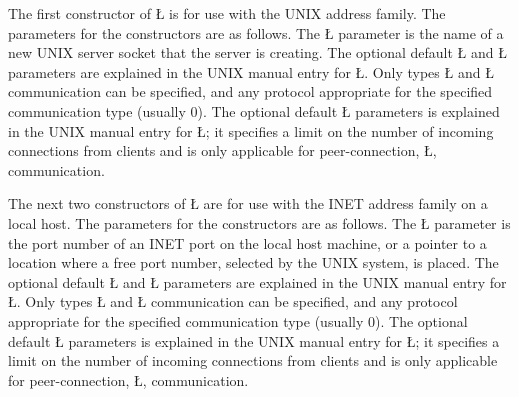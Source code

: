 \documentclass[openright,twoside]{report}
\begin{document}
The first constructor of \LGinlinetrue\LGbegin\lgrinde\L{}\endlgrinde\LGend{} is for use with the UNIX address family.
The parameters for the constructors are as follows.
The \LGinlinetrue\LGbegin\lgrinde\L{}\endlgrinde\LGend{} parameter is the name of a new UNIX server socket that the server is creating.
The optional default \LGinlinetrue\LGbegin\lgrinde\L{}\endlgrinde\LGend{} and \LGinlinetrue\LGbegin\lgrinde\L{}\endlgrinde\LGend{} parameters are explained in the UNIX manual entry for \LGinlinetrue\LGbegin\lgrinde\L{}\endlgrinde\LGend{}.
Only types \LGinlinetrue\LGbegin\lgrinde\L{}\endlgrinde\LGend{} and \LGinlinetrue\LGbegin\lgrinde\L{}\endlgrinde\LGend{} communication can be specified, and any protocol appropriate for the specified communication type (usually 0).
The optional default \LGinlinetrue\LGbegin\lgrinde\L{}\endlgrinde\LGend{} parameters is explained in the UNIX manual entry for \LGinlinetrue\LGbegin\lgrinde\L{}\endlgrinde\LGend{};
it specifies a limit on the number of incoming connections from clients and is only applicable for peer-connection, \LGinlinetrue\LGbegin\lgrinde\L{}\endlgrinde\LGend{}, communication.

The next two constructors of \LGinlinetrue\LGbegin\lgrinde\L{}\endlgrinde\LGend{} are for use with the INET address family on a local host.
The parameters for the constructors are as follows.
The \LGinlinetrue\LGbegin\lgrinde\L{}\endlgrinde\LGend{} parameter is the port number of an INET port on the local host machine, or a pointer to a location where a free port number, selected by the UNIX system, is placed.
The optional default \LGinlinetrue\LGbegin\lgrinde\L{}\endlgrinde\LGend{} and \LGinlinetrue\LGbegin\lgrinde\L{}\endlgrinde\LGend{} parameters are explained in the UNIX manual entry for \LGinlinetrue\LGbegin\lgrinde\L{}\endlgrinde\LGend{}.
Only types \LGinlinetrue\LGbegin\lgrinde\L{}\endlgrinde\LGend{} and \LGinlinetrue\LGbegin\lgrinde\L{}\endlgrinde\LGend{} communication can be specified, and any protocol appropriate for the specified communication type (usually 0).
The optional default \LGinlinetrue\LGbegin\lgrinde\L{}\endlgrinde\LGend{} parameters is explained in the UNIX manual entry for \LGinlinetrue\LGbegin\lgrinde\L{}\endlgrinde\LGend{};
it specifies a limit on the number of incoming connections from clients and is only applicable for peer-connection, \LGinlinetrue\LGbegin\lgrinde\L{}\endlgrinde\LGend{}, communication.
\end{document}
